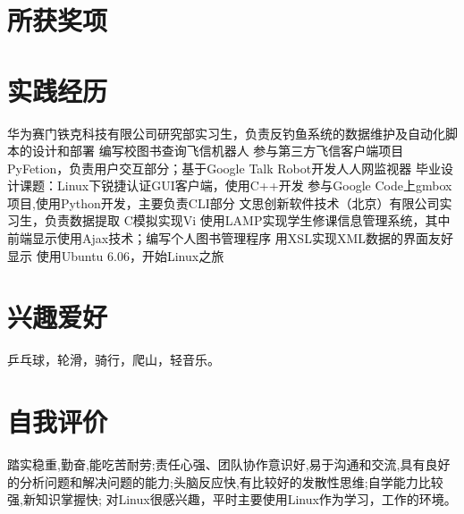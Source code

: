 \documentclass[a4paper]{moderncvwutao}
\begin{document}
\begin{CJK*}{UTF8}{gbsn}
\section{所获奖项}
\section{实践经历}
{ 华为赛门铁克科技有限公司研究部实习生，负责反钓鱼系统的数据维护及自动化脚本的设计和部署}
{ 编写校图书查询飞信机器人}
{ 参与第三方飞信客户端项目PyFetion，负责用户交互部分；基于Google Talk Robot开发人人网监视器}
{ 毕业设计课题：Linux下锐捷认证GUI客户端，使用C++开发 }
{ 参与Google Code上gmbox项目,使用Python开发，主要负责CLI部分 }
{ 文思创新软件技术（北京）有限公司实习生，负责数据提取 }
{ C模拟实现Vi }
{ 使用LAMP实现学生修课信息管理系统，其中前端显示使用Ajax技术；编写个人图书管理程序 }
{ 用XSL实现XML数据的界面友好显示 }
{ 使用Ubuntu 6.06，开始Linux之旅}
\section{兴趣爱好}
\cvitem{}
{
\small 乒乓球，轮滑，骑行，爬山，轻音乐。
}
\section{自我评价}
\cvitem{}{}
{

踏实稳重,勤奋,能吃苦耐劳;责任心强、团队协作意识好,易于沟通和交流,具有良好的分析问题和解决问题的能力;头脑反应快,有比较好的发散性思维;自学能力比较强,新知识掌握快;
对Linux很感兴趣，平时主要使用Linux作为学习，工作的环境。
}
\closesection
\end{CJK*}
\end{document}
